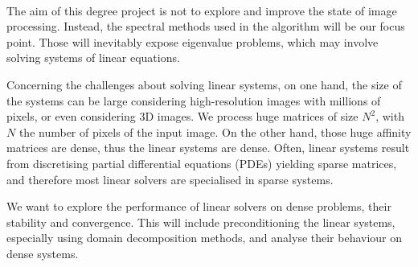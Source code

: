 \paragraph{}
The aim of this degree project is not to explore and improve the state of image processing.
Instead, the spectral methods used in the algorithm will be our focus point.
Those will inevitably expose eigenvalue problems, which may involve solving systems of linear equations.

Concerning the challenges about solving linear systems, on one hand, the size of the systems can be large considering high-resolution images with millions of pixels, or even considering 3D images.
We process huge matrices of size \(N^2\), with \(N\) the number of pixels of the input image.
On the other hand, those huge affinity matrices are dense, thus the linear systems are dense.
Often, linear systems result from discretising partial differential equations (PDEs) yielding sparse matrices, and therefore most linear solvers are specialised in sparse systems.

We want to explore the performance of linear solvers on dense problems, their stability and convergence.
This will include preconditioning the linear systems, especially using domain decomposition methods, and analyse their behaviour on dense systems.
